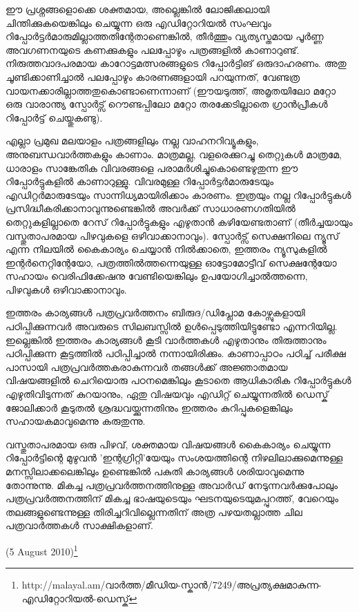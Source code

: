ഈ പ്രശ്നങ്ങളൊക്കെ ശക്തമായ, അല്ലെങ്കില്‍ ലോജിക്കലായി ചിന്തിക്കുകയെങ്കിലും ചെയ്യുന്ന ഒരു എഡിറ്റോറിയല്‍ 
സംഘവും റിപ്പോര്‍ട്ടര്‍മാരുമില്ലാത്തതിന്റേതാണെങ്കില്‍, തീര്‍ത്തും വ്യത്യസ്തമായ പൂര്‍ണ്ണ അവഗണനയുടെ കണക്കുകളും 
പലപ്പോഴും പത്രങ്ങളില്‍ കാണാറുണ്ട്. നിരുത്തവാദപരമായ കാറോട്ടമത്സരങ്ങളുടെ റിപ്പോര്‍ട്ടിങ് ഒരുദാഹരണം. അതു 
ചൂണ്ടിക്കാണിച്ചാല്‍ പലപ്പോഴും കാരണങ്ങളായി പറയുന്നത്, വേണ്ടത്ര വായനക്കാരില്ലാത്തതുകൊണ്ടാണെന്നാണ് 
(ഈയടുത്ത്, അമൃതയിലോ മറ്റോ ഒരു വാരാന്ത്യ സ്പോര്‍ട്സ് റൌണ്ടപ്പിലോ മറ്റോ തരക്കേടില്ലാതെ ഗ്രാന്‍പ്രീകള്‍ 
റിപ്പോര്‍ട്ട് ചെയ്തുകണ്ടു).

എല്ലാ പ്രമുഖ മലയാളം പത്രങ്ങളിലും നല്ല വാഹനറിവ്യൂകളും, അനുബന്ധവാര്‍ത്തകളും കാണാം. മാത്രമല്ല, വളരെക്കുറച്ചു 
തെറ്റുകള്‍ മാത്രമേ, ധാരാളം സാങ്കേതിക വിവരങ്ങളെ പരാമര്‍ശിച്ചുകൊണ്ടെഴുതുന്ന ഈ റിപ്പോര്‍ട്ടുകളില്‍ കാണാറുള്ളു. 
വിവരമുള്ള റിപ്പോര്‍ട്ടര്‍മാരുടേയും എഡിറ്റര്‍മാരുടേയും സാന്നിധ്യമായിരിക്കാം കാരണം. ഇത്രയും നല്ല റിപ്പോര്‍ട്ടുകള്‍ 
പ്രസിദ്ധീകരിക്കാനാവുന്നുണ്ടെങ്കില്‍ അവര്‍ക്ക് സാധാരണഗതിയില്‍ തെറ്റുകളില്ലാതെ റേസ് റിപ്പോര്‍ട്ടുകളും എഴുതാന്‍ 
കഴിയേണ്ടതാണ് (തീര്‍ച്ചയായും വസ്തുതാപരമായ പിഴവുകളെ ഒഴിവാക്കാനാവും). സ്പോര്‍ട്സ് സെക്ഷനിലെ ന്യൂസ് എന്ന 
നിലയില്‍ കൈകാര്യം ചെയ്യാന്‍ നില്‍ക്കാതെ, ഇത്തരം ന്യൂസുകളില്‍ ഇന്റര്‍നെറ്റിന്റേയോ, പത്രത്തില്‍ത്തന്നെയുള്ള 
ഓട്ടോമോട്ടീവ് സെക്ഷന്റേയോ സഹായം വെരിഫിക്കേഷനു വേണ്ടിയെങ്കിലും ഉപയോഗിച്ചാല്‍ത്തന്നെ, പിഴവുകള്‍ 
ഒഴിവാക്കാനാവും.

ഇത്തരം കാര്യങ്ങള്‍ പത്രപ്രവര്‍ത്തനം ബിരുദ/ഡിപ്ലോമ കോഴ്സുകളായി പഠിപ്പിക്കുന്നവര്‍ അവരുടെ സിലബസ്സില്‍ 
ഉള്‍പ്പെടുത്തിയിട്ടുണ്ടോ എന്നറിയില്ല. ഇല്ലെങ്കില്‍ ഇത്തരം കാര്യങ്ങള്‍ കൂടി വാര്‍ത്തകള്‍ എഴുതാനും തിരുത്താനും 
പഠിപ്പിക്കുന്ന കൂട്ടത്തില്‍ പഠിപ്പിച്ചാല്‍ നന്നായിരിക്കും. കാണാപ്പാഠം പഠിച്ച് പരീക്ഷ പാസായി പത്രപ്രവര്‍ത്തകരാകുന്നവര്‍
തങ്ങള്‍ക്ക് അജ്ഞാതമായ വിഷയങ്ങളില്‍ ചെറിയൊരു പഠനമെങ്കിലും കൂടാതെ ആധികാരിക റിപ്പോര്‍ട്ടുകള്‍ 
എഴുതിവിടുന്നത് കുറയാനും, ഏതു വിഷയവും എഡിറ്റ് ചെയ്യുന്നതില്‍ ഡെസ്ക് ജോലിക്കാര്‍ കൂടുതല്‍ ശ്രദ്ധവയ്ക്കുന്നതിനും 
ഇത്തരം കുറിപ്പുകളെങ്കിലും സഹായകമാവുമെന്നു കരുതുന്നു.

വസ്തുതാപരമായ ഒരു പിഴവ്, ശക്തമായ വിഷയങ്ങള്‍ കൈകാര്യം ചെയ്യുന്ന റിപ്പോര്‍ട്ടിന്റെ മുഴുവന്‍ 'ഇന്റഗ്രിറ്റി'യേയും 
സംശയത്തിന്റെ നിഴലിലാക്കുമെന്നുള്ള മനസ്സിലാക്കലെങ്കിലും ഉണ്ടെങ്കില്‍ പകുതി കാര്യങ്ങള്‍ ശരിയാവുമെന്നു തോന്നുന്നു. 
മികച്ച പത്രപ്രവര്‍ത്തനത്തിനുള്ള അവാര്‍ഡ് നേടുന്നവര്‍ക്കുപോലും പത്രപ്രവര്‍ത്തനത്തിന് മികച്ച ഭാഷയുടെയും 
ഘടനയുടെയുമപ്പുറത്ത്, വേറെയും തലങ്ങളുണ്ടെന്നുള്ള തിരിച്ചറിവില്ലെന്നതിന് അത്ര പഴയതല്ലാത്ത ചില 
പത്രവാര്‍ത്തകള്‍ സാക്ഷികളാണ്.

(5 August 2010)\footnote{http://malayal.am/വാര്‍ത്ത/മീഡിയ-സ്കാന്‍/7249/അപ്രത്യക്ഷമാകുന്ന-എഡിറ്റോറിയല്‍-ഡെസ്ക്}

\newpage
